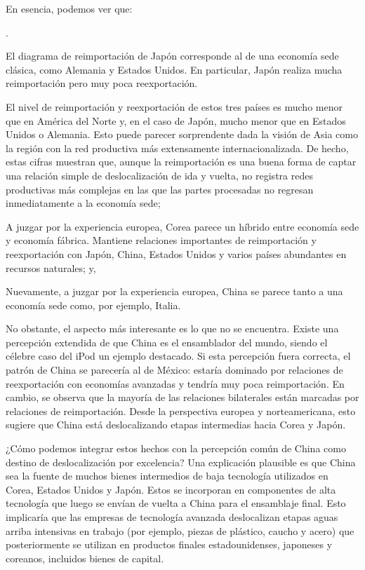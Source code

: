 \documentclass[10pt,a4paper]{article}
\newcounter{numitem}
\newenvironment{lnum}
      {\begin{list}{\arabic{numitem}.}{%
          \usecounter{numitem}%
          \setlength{\leftmargin}{1cm}%
          \setlength{\parskip}{3pt}%
          \setlength{\itemsep}{0pt}%
          \setlength{\parsep}{0pt}%
      }}
      {\end{list}}
\begin{document}
En esencia, podemos ver que:
\begin{lnum}
    \item El diagrama de reimportación de Japón corresponde al de una economía sede clásica, como Alemania y Estados Unidos. En particular, Japón realiza mucha reimportación pero muy poca reexportación. 
    \item El nivel de reimportación y reexportación de estos tres países es mucho menor que en América del Norte y, en el caso de Japón, mucho menor que en Estados Unidos o Alemania. Esto puede parecer sorprendente dada la visión de Asia como la región con la red productiva más extensamente internacionalizada. De hecho, estas cifras muestran que, aunque la reimportación es una buena forma de captar una relación simple de deslocalización de ida y vuelta, no registra redes productivas más complejas en las que las partes procesadas no regresan inmediatamente a la economía sede;
    \item A juzgar por la experiencia europea, Corea parece un híbrido entre economía sede y economía fábrica. Mantiene relaciones importantes de reimportación y reexportación con Japón, China, Estados Unidos y varios países abundantes en recursos naturales; y,
    \item Nuevamente, a juzgar por la experiencia europea, China se parece tanto a una economía sede como, por ejemplo, Italia.
\end{lnum}

No obstante, el aspecto más interesante es lo que no se encuentra. Existe una percepción extendida de que China es el ensamblador del mundo, siendo el célebre caso del iPod un ejemplo destacado. Si esta percepción fuera correcta, el patrón de China se parecería al de México: estaría dominado por relaciones de reexportación con economías avanzadas y tendría muy poca reimportación. En cambio, se observa que la mayoría de las relaciones bilaterales están marcadas por relaciones de reimportación. Desde la perspectiva europea y norteamericana, esto sugiere que China está deslocalizando etapas intermedias hacia Corea y Japón.

¿Cómo podemos integrar estos hechos con la percepción común de China como destino de deslocalización por excelencia? Una explicación plausible es que China sea la fuente de muchos bienes intermedios de baja tecnología utilizados en Corea, Estados Unidos y Japón. Estos se incorporan en componentes de alta tecnología que luego se envían de vuelta a China para el ensamblaje final. Esto implicaría que las empresas de tecnología avanzada deslocalizan etapas aguas arriba intensivas en trabajo (por ejemplo, piezas de plástico, caucho y acero) que posteriormente se utilizan en productos finales estadounidenses, japoneses y coreanos, incluidos bienes de capital.
\end{document}
